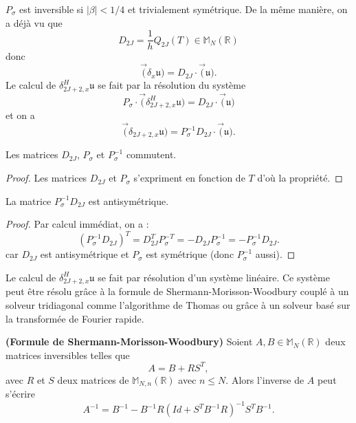 $P_{\sigma}$ est inversible si $|\beta |<1/4$ et trivialement symétrique. 
De la même manière, on a déjà vu que 
\begin{equation}
D_{2J} = \dfrac{1}{h} Q_{2J}(T) \in \mathbb{M}_{N}(\mathbb{R})
\end{equation}
donc 
\begin{equation}
\vec (\delta_{x} \mathfrak{u}) = D_{2J} \cdot \vec (\mathfrak{u}).
\label{eq:systhermitien}
\end{equation}
Le calcul de $\delta^H_{2J+2,x} \mathfrak{u}$ se fait par la résolution du système
\begin{equation}
P_{\sigma} \cdot \vec (\delta_{2J+2,x}^H \mathfrak{u}) = D_{2J} \cdot \vec (\mathfrak{u})
\end{equation}
et on a 
\begin{equation}
\vec (\delta_{2J+2,x} \mathfrak{u} ) =P_{\sigma}^{-1} D_{2J} \cdot \vec (\mathfrak{u}).
\end{equation}

\begin{proposition}
Les matrices $D_{2J}$, $P_{\sigma}$ et $P^{-1}_{\sigma}$ commutent.
\end{proposition}

\begin{proof}
Les matrices $D_{2J}$ et $P_{\sigma}$ s'expriment en fonction de $T$ d'où la propriété.
\end{proof}

\begin{proposition}
La matrice $P^{-1}_{\sigma}D_{2J}$ est antisymétrique.
\label{prop:derhermi_antisym}
\end{proposition}

\begin{proof}
Par calcul immédiat, on a :
\begin{equation}
(P^{-1}_{\sigma}D_{2J})^T = D_{2J}^T P_{\sigma}^{-T} = - D_{2J} P_{\sigma}^{-1} = - P_{\sigma}^{-1} D_{2J}.
\end{equation}
car $D_{2J}$ est antisymétrique et $P_{\sigma}$ est symétrique (donc $P^{-1}_{\sigma}$ aussi). 
\end{proof}

Le calcul de $\delta_{2J+2,x}^H \mathfrak{u}$ se fait par résolution d'un système linéaire. Ce système peut être résolu grâce à la formule de Shermann-Morisson-Woodbury couplé à un solveur tridiagonal comme l'algorithme de Thomas ou grâce à un solveur basé sur la transformée de Fourier rapide.

\begin{proposition}
\textbf{(Formule de Shermann-Morisson-Woodbury)} Soient $A, B \in \mathbb{M}_N \left(\mathbb{R} \right)$ deux matrices inversibles telles que 
\begin{equation}
A = B + R S^T,
\end{equation}
avec $R$ et $S$ deux matrices de $\mathbb{M}_{N,n} \left(\mathbb{R} \right)$ avec $n \leq N$.
Alors l'inverse de $A$ peut s'écrire
\begin{equation}
A^{-1} = B^{-1} - B^{-1} R \left( Id + S^T B^{-1} R  \right)^{-1} S^T B^{-1}.
\label{eq:SMW}
\end{equation}
\end{proposition}

